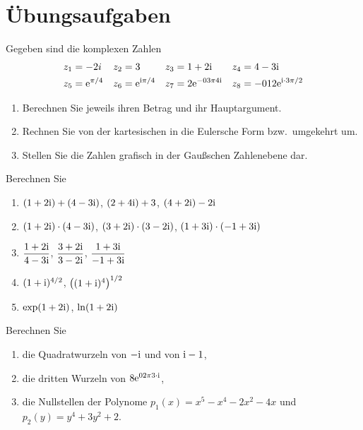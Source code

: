 \section{Übungsaufgaben}

\Aufgabe
Gegeben sind die komplexen Zahlen
\begin{align*}
z_1 &= -2i
& z_2 &= 3
& z_3 &= 1+2\imag
& z_4 &= 4-3\imag
\\
z_5 &= \e^{\pi/4}
& z_6 &= \e^{\imag\pi/4}
& z_7 &= 2\e^{-\frac{3\pi}4\imag}
& z_8 &= -\frac12\e^{\imag\cdot3\pi/2}
\end{align*}

\begin{enumerate}
\item{}Berechnen Sie jeweils ihren Betrag und ihr Hauptargument.

\item{}Rechnen Sie von der kartesischen in die Eulersche Form bzw.\ umgekehrt um.

\item{}Stellen Sie die Zahlen grafisch in der Gaußschen Zahlenebene dar.

\end{enumerate}

\Aufgabe
Berechnen Sie
\begin{enumerate}
\item$(1+2\mathrm{i})+(4-3\mathrm{i})$, $(2+4\mathrm{i})+3$, $(4+2\mathrm{i})-2\mathrm{i}$

\item$(1+2\mathrm{i})\cdot(4-3\mathrm{i})$, $(3+2\mathrm{i})\cdot(3-2\mathrm{i})$, $(1+3\mathrm{i})\cdot(-1+3\mathrm{i})$

\item$\dfrac{1+2\mathrm{i}}{4-3\mathrm{i}}$, $\dfrac{3+2\mathrm{i}}{3-2\mathrm{i}}$, $\dfrac{1+3\mathrm{i}}{-1+3\mathrm{i}}$

\item $(1+\mathrm{i})^{4/2}$, $\left((1+\mathrm{i})^4\right)^{1/2}$

\item$\exp(1+2\mathrm{i})$, $\ln(1+2\mathrm{i})$

\end{enumerate}

\Aufgabe
Berechnen Sie
\begin{enumerate}
\item{}die Quadratwurzeln von $-\mathrm{i}$ und von $\mathrm{i}-1$,

\item{}die dritten Wurzeln von $8\e^{\frac{2\pi}3\cdot\imag}$,

\item{}die Nullstellen der Polynome $p_1(x)=x^5-x^4-2x^2-4x$ und $p_2(y)=y^4+3y^2+2$.

\end{enumerate}

